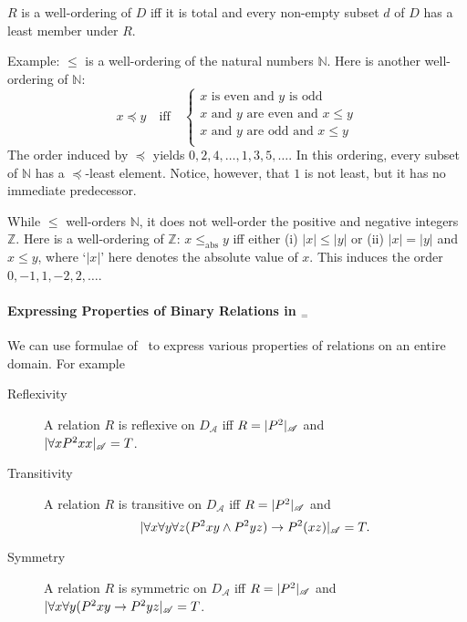 \begin{definition}
  $R$ is a well-ordering of $D$ iff it is total and every non-empty subset $d$ of $D$ has a least member under $R$.
\end{definition} Example: $\leqslant$ is a well-ordering of the natural numbers $\mathbb{N}$. Here is another well-ordering of $\mathbb{N}$: \begin{equation}
  x \preccurlyeq y \quad\text{iff}\quad \begin{cases}
    \text{$x$ is even and $y$ is odd}\\
    \text{$x$ and $y$ are even and $x\leqslant y$}\\
    \text{$x$ and $y$ are odd and $x\leqslant y$}\\
  \end{cases}
\end{equation} The order induced by $\preccurlyeq$ yields $0, 2, 4, \ldots, 1, 3, 5, \ldots$. In this ordering, every subset of $\mathbb{N}$ has a $\preccurlyeq$-least element. Notice, however, that $1$ is not least, but it has no immediate predecessor. 

While $\leqslant$ well-orders $\mathbb{N}$, it does not well-order the positive and negative integers $\mathbb{Z}$. Here is a well-ordering of $\mathbb{Z}$: $x \leqslant_{\text{abs}} y$ iff either (i) $|x|\leqslant |y|$ or (ii) $|x|=|y|$ and $x\leqslant y$, where `$|x|$' here denotes the absolute value of $x$.  This induces the order $0,-1,1,-2,2,\ldots$.


 
 \paragraph{Expressing Properties of Binary Relations in \ltwo$_{=}$}
 
 We can use formulae of \ltwo\ to express various properties of relations on an entire domain. For example \begin{description}
 	\item [Reflexivity] A relation $R$ is reflexive on $D_{\mathscr{A}}$ iff $R = |P^{2}|_{\mathscr{A}}$ and\\ $|\forall x P^{2}xx|_{\mathscr{A}}=T$. 
\item [Transitivity] A relation $R$ is transitive on $D_{\mathscr{A}}$ iff $R = |P^{2}|_{\mathscr{A}}$ and $$|\forall x \forall y \forall z (P^{2}xy \wedge P^{2}yz) \to P^{2}(xz)|_{\mathscr{A}}=T.$$ 
\item [Symmetry] A relation $R$ is symmetric on $D_{\mathscr{A}}$ iff $R = |P^{2}|_{\mathscr{A}}$ and\\ $|\forall x \forall y  (P^{2}xy \to P^{2}yz|_{\mathscr{A}}=T$. 
 \end{description}

